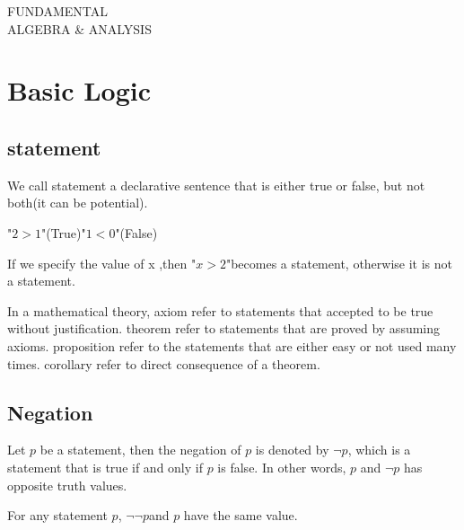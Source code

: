 \documentclass{book}
\begin{document}
\setlength{\parindent}{0em}
\begin{box3}
        \begin{center}
            \Huge 
    FUNDAMENTAL \\
    ALGEBRA \& ANALYSIS
        \end{center}
    
    \end{box3}
\thispagestyle{empty}
    \newpage
{}
\setcounter{page}{1}
\tableofcontents
\clearpage
{}
\setcounter{page}{1}




\chapter{Basic Logic}
\section{statement}
\begin{definitionenv}
    We call statement a declarative sentence that is either true or false, but not both(it can be potential).    
\end{definitionenv}
\begin{exampleenv}
    "$2>1$"(True)\quad "$1<0$"(False)
\end{exampleenv}
If we specify the value of x ,then "$x>2$"becomes a statement, otherwise it is not a statement.
\begin{definitionenv}
    In a mathematical theory,
    \newline 
    axiom refer to statements that accepted to be true without justification.
    \newline
    theorem refer to statements that are proved by assuming axioms.
    \newline
    proposition refer to the statements that are either easy or not used many times.
    \newline
    corollary refer to direct consequence of a theorem.
\end{definitionenv}




\section{Negation}
\begin{definitionenv}
    Let $p$ be a statement, then the negation of $p$ is denoted by $\neg p$, which is a statement that is true if and only if $p$ is false.
    In other words, $p$ and $\neg p$ has opposite truth values.
\end{definitionenv}
\begin{propositionenv}
For any statement $p$, $\neg \neg p$and $p$ have the same value.
\end{propositionenv}
\end{document}
